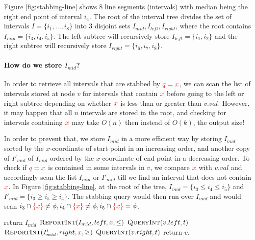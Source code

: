 Figure \ref{fig:stabbing-line} shows 8 line segments (intervals) with median being the right end point of interval $i_4$.
%
The root of the interval tree divides the set of intervals $I = \{i_1, \dots, i_8\}$ into 3 disjoint sets $I_{mid}, I_{left}, I_{right}$, where the root contains $I_{mid} = \{ i_3, i_4, i_5 \}$.
%
The left subtree will recursively store $I_{left} = \{ i_1, i_2 \}$ and the right subtree will recursively store $I_{right} =\{i_6, i_7, i_8 \}$.
% 
\paragraph{How do we store $I_{mid}$?} 
In order to retrieve all intervals that are stabbed by $\textcolor{red}{q = x}$, we can scan the list of intervals stored at node $v$ for intervals that contain $\textcolor{red}{x}$ before going to the left or right subtree depending on whether $\textcolor{red}{x}$ is less than or greater than $v.val$.
%
However, it may happen that all $n$ intervals are stored in the root, and checking for intervals containing $\textcolor{red}{x}$ may take $O(n)$ then instead of $O(k)$, the output size!

In order to prevent that, we store $I_{mid}$ in a more efficient way by storing $I_{mid}$ sorted by the $x$-coordinate of start point in an increasing order, and another copy of $I'_{mid}$ of $I_{mid}$ ordered by the $x$-coordinate of end point in a decreasing order.
%
To check if $\textcolor{red}{q = x}$ is contained in some intervals in $v$, we compare $\textcolor{red}{x} $ with $v.val$ and accordingly scan the list $I_{mid}$ or $I'_{mid}$ till we find an interval that does not contain $\textcolor{red}{x}$.
%  
In Figure \ref{fig:stabbing-line}, at the root of the tree, $I_{mid} = \{ i_3 \leq  i_4 \leq i_5 \} $ and $I'_{mid} = \{ i_3 \geq  i_5 \geq i_4 \}$. 
%
The stabbing query would then run over $I_{mid}$ and would scan $i_3 \cap \textcolor{red}{\{x\}} \neq \phi, i_4 \cap \textcolor{red}{\{x\}} \neq \phi ,  i_5 \cap \textcolor{red}{\{x\}} = \phi$.  

\begin{algorithm}[H]
    \caption{} 
    \label{alg:build-interval}
    \begin{algorithmic}[1]
        		return $I_{mid}$
        	\EndIf
        		\State $ \textsc{ReportInt} ( I_{mid}, left ,\textcolor{red}{x} , \leq ) $ 
            \State$  \textsc{QueryInt}(v.left, t)$ 
       		\Else 
       			\State $\textsc{ReportInt} ( I'_{mid}, right, \textcolor{red}{x} , \geq )  $ 
            \State $ \textsc{QueryInt}(v.right, t)$ 
        	\EndIf
          \State return $v$. 
        \EndFunction
    \end{algorithmic}
\end{algorithm}

